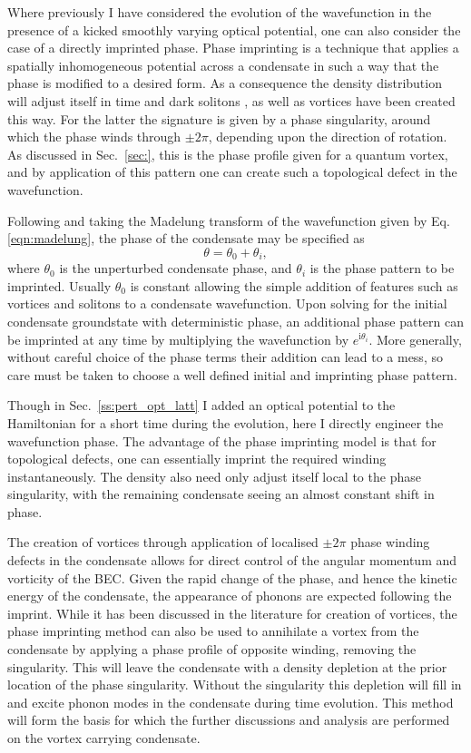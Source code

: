Where previously I have considered the evolution of the wavefunction in the presence of a kicked smoothly varying optical potential, one can also consider the case of a directly imprinted phase. Phase imprinting is a technique that applies a spatially inhomogeneous potential across a condensate in such a way that the phase is modified to a desired form. As a consequence the density distribution will adjust itself in time and dark solitons \cite{BEC:Denschlag_science_2000}, as well as vortices \cite{Vtx:Dobrek_pra_1999} have been created this way. For the latter the signature is given by a phase singularity, around which the phase winds through $\pm 2\pi$, depending upon the direction of rotation. As discussed in Sec.~\ref{sec:}, this is the phase profile given for a quantum vortex, and by application of this pattern one can create such a topological defect in the wavefunction.

Following \cite{BK:Pitaevskii_Stringari_2003} and taking the Madelung transform of the wavefunction given by Eq. \eqref{eqn:madelung}, the phase of the condensate may be specified as
\begin{equation}
\theta = \theta_0 + \theta_i,
\end{equation}
where $\theta_0$ is the unperturbed condensate phase, and $\theta_i$ is the phase pattern to be imprinted. Usually $\theta_0$ is constant allowing the simple addition of features such as vortices and solitons to a condensate wavefunction. Upon solving for the initial condensate groundstate with deterministic phase, an additional phase pattern can be imprinted at any time by multiplying the wavefunction by $e^{\text{i}\theta_i}$. More generally, without careful choice of the phase terms their addition can lead to a mess, so care must be taken to choose a well defined initial and imprinting phase pattern.

Though in Sec.~\ref{ss:pert_opt_latt} I added an optical potential to the Hamiltonian for a short time during the evolution, here I directly engineer the wavefunction phase. The advantage of the phase imprinting model is that for topological defects, one can essentially imprint the required winding instantaneously. The density also need only adjust itself local to the phase singularity, with the remaining condensate seeing an almost constant shift in phase.

The creation of vortices through application of localised $\pm 2\pi$ phase winding defects in the condensate allows for direct control of the angular momentum and vorticity of the BEC. Given the rapid change of the phase, and hence the kinetic energy of the condensate, the appearance of phonons are expected following the imprint. While it has been discussed in the literature for creation of vortices, the phase imprinting method can also be used to annihilate a vortex from the condensate by applying a phase profile of opposite winding, removing the singularity. This will leave the condensate with a density depletion at the prior location of the phase singularity. Without the singularity this depletion will fill in and excite phonon modes in the condensate during time evolution. This method will form the basis for which the further discussions and analysis are performed on the vortex carrying condensate.

